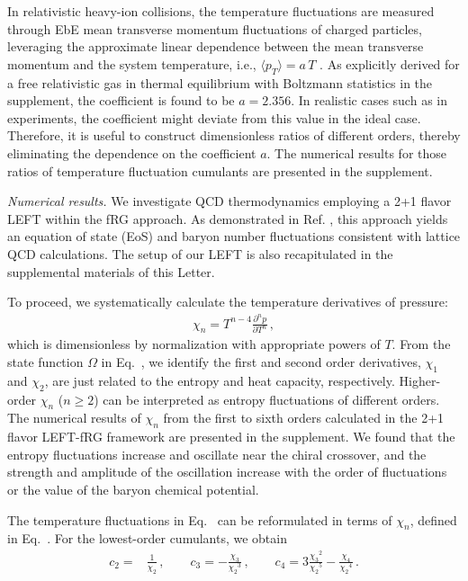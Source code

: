 \documentclass[aps,twocolumn,prd,superscriptaddress,nofootinbib,floatfix]{revtex4-2}
\begin{document}
 {\color{blue} In relativistic heavy-ion collisions, the temperature fluctuations are measured through EbE mean transverse momentum fluctuations of charged particles, leveraging the approximate linear dependence between the mean transverse momentum and the system temperature, i.e., $\langle p_{T} \rangle = a\,T$ \cite{Gardim:2019xjs, Gardim:2019brr, Giacalone:2020lbm, Gardim:2024zvi}. As explicitly derived for a free relativistic gas in thermal equilibrium with Boltzmann statistics in the supplement, the coefficient is found to be $a=2.356$. In realistic cases such as in experiments, the coefficient might deviate from this value in the ideal case. Therefore, it is useful to construct dimensionless ratios of different orders, thereby eliminating the dependence on the coefficient $a$. The numerical results for those ratios of temperature fluctuation cumulants are presented in the supplement.}


\textit{Numerical results.}\label{sec:numerical} We investigate QCD thermodynamics employing a 2+1 flavor LEFT within the fRG approach. As demonstrated in Ref. \cite{Wen:2018nkn}, this approach yields an equation of state (EoS) and baryon number fluctuations consistent with lattice QCD calculations. The setup of our LEFT is also recapitulated in the supplemental materials of this Letter.

To proceed, we systematically calculate the temperature derivatives of pressure: 
\begin{align}
    \chi_n=T^{n-4}\frac{\partial^n p}{\partial T^n}\,, \label{eq:chi}
\end{align}
which is dimensionless by normalization with appropriate powers of $T$. From the state function $\Omega$ in Eq.~, we identify the first and second order derivatives, $\chi_1$ and $\chi_2$, are just related to the entropy and heat capacity, respectively. Higher-order $\chi_n$ ($n \geq 2$) can be interpreted as entropy fluctuations of different orders. The numerical results of $\chi_n$ from the first to sixth orders calculated in the 2+1 flavor LEFT-fRG framework are presented in the supplement. We found that the entropy fluctuations increase and oscillate near the chiral crossover, and the strength and amplitude of the oscillation increase with the order of fluctuations or the value of the baryon chemical potential. 

The temperature fluctuations in Eq.~ can be reformulated in terms of $\chi_n$, defined in Eq.~. For the lowest-order cumulants, we obtain
\begin{align}
    c_2=&\frac{1}{\chi_2}\,, \qquad c_3=-\frac{\chi_3}{{\chi_2}^3}\,, \qquad c_4=3\frac{{\chi_3}^2}{{\chi_2}^5}-\frac{\chi_4}{{\chi_2}^4}\,. \label{}
\end{align}
\end{document}
